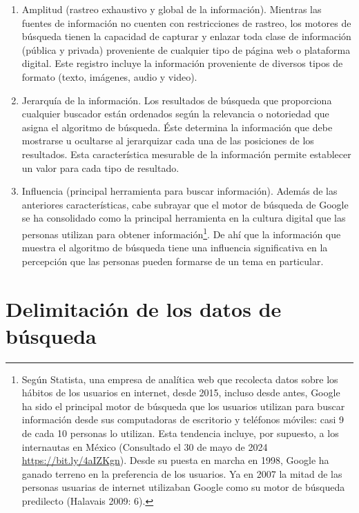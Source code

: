 \documentclass[
]{interact}
\begin{document}
\begin{enumerate}
\def\labelenumi{\arabic{enumi}.}
\item
  Amplitud (rastreo exhaustivo y global de la información). Mientras las
  fuentes de información no cuenten con restricciones de rastreo, los
  motores de búsqueda tienen la capacidad de capturar y enlazar toda
  clase de información (pública y privada) proveniente de cualquier tipo
  de página web o plataforma digital. Este registro incluye la
  información proveniente de diversos tipos de formato (texto, imágenes,
  audio y video).
\item
  Jerarquía de la información. Los resultados de búsqueda que
  proporciona cualquier buscador están ordenados según la relevancia o
  notoriedad que asigna el algoritmo de búsqueda. Éste determina la
  información que debe mostrarse u ocultarse al jerarquizar cada una de
  las posiciones de los resultados. Esta característica mesurable de la
  información permite establecer un valor para cada tipo de resultado.
\item
  Influencia (principal herramienta para buscar información). Además de
  las anteriores características, cabe subrayar que el motor de búsqueda
  de Google se ha consolidado como la principal herramienta en la
  cultura digital que las personas utilizan para obtener
  información\footnote{Según Statista, una empresa de analítica web que
    recolecta datos sobre los hábitos de los usuarios en internet, desde
    2015, incluso desde antes, Google ha sido el principal motor de
    búsqueda que los usuarios utilizan para buscar información desde sus
    computadoras de escritorio y teléfonos móviles: casi 9 de cada 10
    personas lo utilizan. Esta tendencia incluye, por supuesto, a los
    internautas en México (Consultado el 30 de mayo de 2024
    \href{https://bit.ly/4aIZKgn}{\ul{https://bit.ly/4aIZKgn}}). Desde
    su puesta en marcha en 1998, Google ha ganado terreno en la
    preferencia de los usuarios. Ya en 2007 la mitad de las personas
    usuarias de internet utilizaban Google como su motor de búsqueda
    predilecto (Halavais 2009: 6).}. De ahí que la información que
  muestra el algoritmo de búsqueda tiene una influencia significativa en
  la percepción que las personas pueden formarse de un tema en
  particular.
\end{enumerate}

\section{Delimitación de los datos de
búsqueda}\label{delimitaciuxf3n-de-los-datos-de-buxfasqueda}
\end{document}
